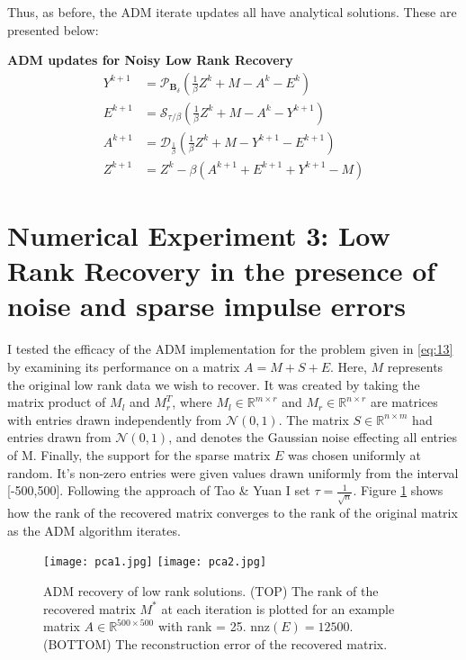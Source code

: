 \documentclass{article}
\begin{document}
Thus, as before, the ADM iterate updates all have analytical solutions.  These are presented below:
\begin{framed}
\textbf{ADM updates for Noisy Low Rank Recovery}
\begin{subequations}
\begin{align}
Y^{k+1} &= \mathcal{P}_{\textbf{B}_\delta}( \frac 1 \beta Z^k + M - A^k - E^k) \label{eq:17a}\\
E^{k+1} &= \mathcal{S}_{\tau / \beta}(\frac 1 \beta Z^k + M - A^k - Y^{k+1}) \label{eq:17b} \\
A^{k+1} &= \mathcal{D}_{\frac 1 \beta}(\frac 1 \beta Z^k + M - Y^{k+1} - E^{k+1}) \label{eq:17c}\\
Z^{k+1} &= Z^k - \beta \left( A^{k+1} + E^{k+1} + Y^{k+1} - M \right) \label{eq:12c}
\end{align} 
\end{subequations}
\end{framed}
\section{Numerical Experiment 3: Low Rank Recovery in the presence of noise and sparse impulse errors}

I tested the efficacy of the ADM implementation for the problem given in \ref{eq:13} by examining its performance on a matrix $A = M + S + E$.  Here, $M$ represents the original low rank data we wish to recover.  It was created by taking the matrix product of  $M_l$ and $M_r^T$, where $M_l \in \mathbb{R}^{m \times r}$ and $M_r \in \mathbb{R}^{n \times r}$ are matrices with entries drawn independently from $\mathcal{N}(0,1)$.  The matrix $S \in \mathbb{R}^{n \times m}$ had entries drawn from $\mathcal{N}(0,1)$, and denotes the Gaussian noise effecting all entries of M.  Finally, the support for the sparse matrix $E$ was chosen uniformly at random.  It's non-zero entries were given values drawn uniformly from the interval [-500,500].  Following the approach of Tao \& Yuan I set $\tau = \frac 1 {\sqrt{n}}$.  Figure \ref{fig:PCA} shows how the rank of the recovered matrix converges to the rank of the original matrix as the ADM algorithm iterates.
\begin{figure}
\caption{ADM recovery of low rank solutions.  (TOP) The rank of the recovered matrix $M^*$ at each iteration is plotted for an example matrix $A \in \mathbb{R}^{500 \times 500}$ with rank = 25.  $\textrm{nnz}(E) = 12500$.  (BOTTOM) The reconstruction error of the recovered matrix.}
\label{fig:PCA}
\centering
\texttt{[image: pca1.jpg]} 
\texttt{[image: pca2.jpg]}
\end{figure}
\end{document}
